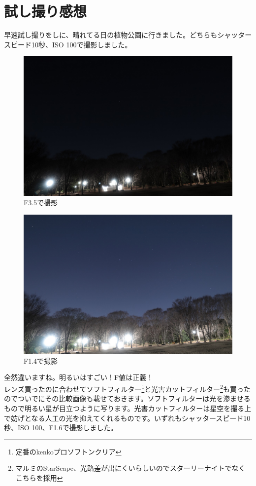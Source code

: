 \documentclass[a4paper.10pt]{jarticle}
\begin{document}
\section{試し撮り感想}
早速試し撮りをしに、晴れてる日の植物公園に行きました。どちらもシャッタースピード10秒、ISO 100で撮影しました。
\begin{figure}[H]
	\begin{center}
		\includegraphics[width=12cm]{kurai.jpg}
		\caption{F3.5で撮影}
		\label{}
	\end{center}
\end{figure}
\begin{figure}[H]
	\begin{center}
		\includegraphics[width=12cm]{akarui.jpg}
		\caption{F1.4で撮影}
		\label{}
	\end{center}
\end{figure}
全然違いますね。明るいはすごい！F値は正義！\\
レンズ買ったのに合わせてソフトフィルター\footnote{定番のkenkoプロソフトンクリア}と光害カットフィルター\footnote{マルミのStarScape、光路差が出にくいらしいのでスターリーナイトでなくこちらを採用}も買ったのでついでにその比較画像も載せておきます。ソフトフィルターは光を滲ませるもので明るい星が目立つように写ります。光害カットフィルターは星空を撮る上で妨げとなる人工の光を抑えてくれるものです。いずれもシャッタースピード10秒、ISO 100、F1.6で撮影しました。
\end{document}
